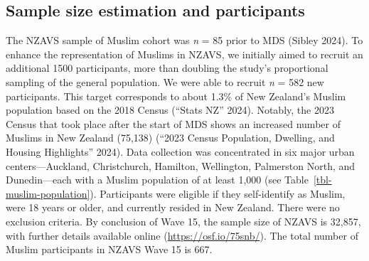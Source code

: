 \documentclass[
]{interact}
\begin{document}
\subsection{Sample size estimation and
participants}\label{sample-size-estimation-and-participants}

The NZAVS sample of Muslim cohort was \emph{n} = 85 prior to MDS (Sibley
2024). To enhance the representation of Muslims in NZAVS, we initially
aimed to recruit an additional 1500 participants, more than doubling the
study's proportional sampling of the general population. We were able to
recruit \emph{n} = 582 new participants. This target corresponds to
about 1.3\% of New Zealand's Muslim population based on the 2018 Census
({``Stats NZ''} 2024). Notably, the 2023 Census that took place after
the start of MDS shows an increased number of Muslims in New Zealand
(75,138) ({``2023 {C}ensus {P}opulation, {D}welling, and {H}ousing
{H}ighlights''} 2024). Data collection was concentrated in six major
urban centers---Auckland, Christchurch, Hamilton, Wellington, Palmerston
North, and Dunedin---each with a Muslim population of at least 1,000
(see Table~\ref{tbl-muslim-population}). Participants were eligible if
they self-identify as Muslim, were 18 years or older, and currently
resided in New Zealand. There were no exclusion criteria. By conclusion
of Wave 15, the sample size of NZAVS is 32,857, with further details
available online (\url{https://osf.io/75snb/}). The total number of
Muslim participants in NZAVS Wave 15 is 667.

\begin{table}

\caption{\label{tbl-muslim-population}}


\end{table}%
\end{document}

